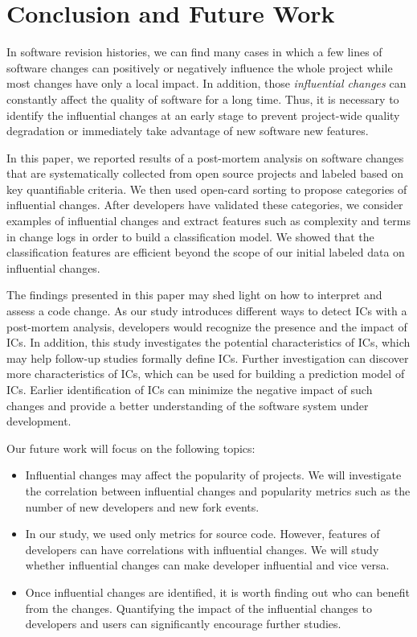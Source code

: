 \section{Conclusion and Future Work}
\label{sec:conclusion}

In software revision histories, we can find many cases in which a few lines of
software changes can positively or negatively influence the whole project
while most changes have only a local impact. In addition, those
\emph{influential changes} can constantly affect the quality of software for a
long time. Thus, it is necessary to identify the influential changes at an
early stage to prevent project-wide quality degradation or immediately
take advantage of new software new features.

In this paper, we reported results of a post-mortem analysis on \numChanges
software changes that are systematically collected from \numSubjects open
source projects  and labeled based on key quantifiable criteria. We then
used open-card sorting to propose categories of influential changes.
After developers have validated these categories, we consider examples of
influential changes and extract features such as 
complexity and terms in change logs in order to build a classification model.
We showed that the classification features are efficient beyond the scope
of our initial labeled data on influential changes. 

The findings presented in this paper may shed light on how to interpret and
assess a code change. As our study introduces different ways to detect ICs with
a post-mortem analysis, developers would recognize the presence and the impact of
ICs. In addition, this study investigates the potential characteristics of ICs, which
may help follow-up studies formally define ICs. 
Further investigation can discover more characteristics of ICs, which can be
used for building a prediction model of ICs. Earlier identification of ICs
can minimize the negative impact of such changes and provide a better understanding
of the software system under development. 


Our future work will focus on the following topics: 
\begin{itemize}
  \item Influential changes may affect the popularity of projects. We will
  investigate the correlation between influential changes and popularity metrics
  such as the number of new developers and new fork events.
  \item In our study, we used only metrics for source code. However, features of
  developers can have correlations with influential changes. We will study
  whether influential changes can make developer influential and vice versa.
  \item Once influential changes are identified, it is worth finding out who can
  benefit from the changes. Quantifying the impact of the influential changes to
  developers and users can significantly encourage further studies.
\end{itemize}
